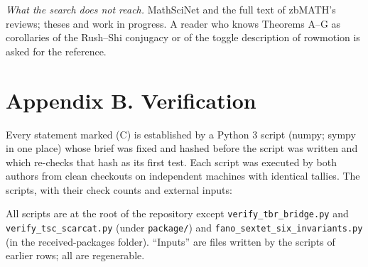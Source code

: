 \documentclass[
]{article}
\begin{document}
\emph{What the search does not reach.} MathSciNet and the full text of
zbMATH's reviews; theses and work in progress. A reader who knows
Theorems A--G as corollaries of the Rush--Shi conjugacy or of the toggle
description of rowmotion is asked for the reference.

\section{Appendix B. Verification}\label{appendix-b.-verification}

Every statement marked (C) is established by a Python 3 script (numpy;
sympy in one place) whose brief was fixed and hashed before the script
was written and which re-checks that hash as its first test. Each script
was executed by both authors from clean checkouts on independent
machines with identical tallies. The scripts, with their check counts
and external inputs:

All scripts are at the root of the repository except
\texttt{verify\_tbr\_bridge.py} and \texttt{verify\_tsc\_scarcat.py}
(under \texttt{package/}) and \texttt{fano\_sextet\_six\_invariants.py}
(in the received-packages folder). ``Inputs'' are files written by the
scripts of earlier rows; all are regenerable.
\end{document}
